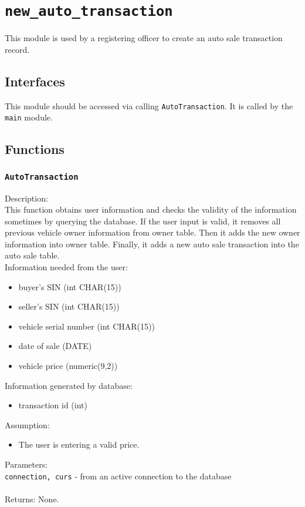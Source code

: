 \documentclass[12pt]{article}
\begin{document}
\section{\texttt{new\_auto\_transaction}}
This module is used by a registering officer to create 
an auto sale transaction record.
\subsection{Interfaces}
This module should be accessed via calling \texttt{AutoTransaction}. It is called by the \texttt{main} module.

\subsection{Functions}
\subsubsection{\texttt{AutoTransaction}}
Description:\\
\indent This function obtains user information and checks the 
validity of the information sometimes by querying the 
database. If the user input is valid, it removes all 
previous vehicle owner information from owner table.
Then it adds the new owner information into owner table.
Finally, it adds a new auto sale transaction into 
the auto sale table.\\
Information needed from the user:
\begin{itemize}
\item buyer's SIN (int CHAR(15))
\item seller's SIN (int CHAR(15))
\item vehicle serial number (int CHAR(15))
\item date of sale (DATE)
\item vehicle price (numeric(9,2))
\end{itemize}
Information generated by database:
\begin{itemize}
\item transaction id (int)
\end{itemize}
\noindent Assumption:
\begin{itemize}
\item The user is entering a valid price.
\end{itemize}
Parameters:\\
\indent\texttt{connection, curs} - from an active connection to the database\\\\
Returns: None.
\end{document}
